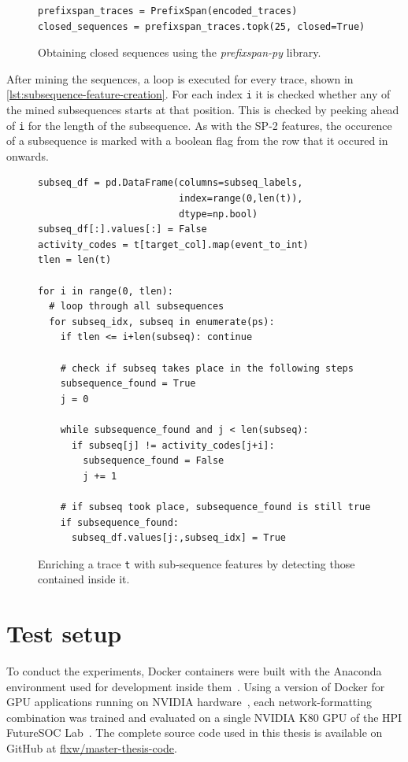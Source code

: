 \begin{figure}
\begin{verbatim}
prefixspan_traces = PrefixSpan(encoded_traces)
closed_sequences = prefixspan_traces.topk(25, closed=True)
\end{verbatim}
\caption{Obtaining closed sequences using the \textit{prefixspan-py} library.}
\label{lst:pfs-mining}
\end{figure}

After mining the sequences, a loop is executed for every trace, shown in \autoref{lst:subsequence-feature-creation}. For each index \verb=i= it is checked whether any of the mined subsequences starts at that position. This is checked by peeking ahead of \verb=i= for the length of the subsequence. As with the SP-2 features, the occurence of a subsequence is marked with a boolean flag from the row that it occured in onwards.

\begin{figure}
\begin{verbatim}
subseq_df = pd.DataFrame(columns=subseq_labels,
                         index=range(0,len(t)),
                         dtype=np.bool)
subseq_df[:].values[:] = False
activity_codes = t[target_col].map(event_to_int)
tlen = len(t)

for i in range(0, tlen):
  # loop through all subsequences
  for subseq_idx, subseq in enumerate(ps):
    if tlen <= i+len(subseq): continue
            
    # check if subseq takes place in the following steps
    subsequence_found = True
    j = 0
    
    while subsequence_found and j < len(subseq):
      if subseq[j] != activity_codes[j+i]:
        subsequence_found = False
        j += 1

    # if subseq took place, subsequence_found is still true
    if subsequence_found:
      subseq_df.values[j:,subseq_idx] = True
\end{verbatim}
\caption{Enriching a trace \texttt{t} with sub-sequence features by detecting those contained inside it.}
\label{lst:subsequence-feature-creation}
\end{figure}

\section{Test setup}
\label{sec:eval:test-setup}
To conduct the experiments, Docker containers were built with the Anaconda environment used for development inside them~\cite{web:docker}. Using a version of Docker for GPU applications running on NVIDIA hardware~\cite{web:nvidia-docker}, each network-formatting combination was trained and evaluated on a single NVIDIA K80 GPU of the HPI FutureSOC Lab~\cite{web:fsoc}. The complete source code used in this thesis is available on GitHub at \href{https://github.com/flxw/master-thesis-code}{flxw/master-thesis-code}.\\

